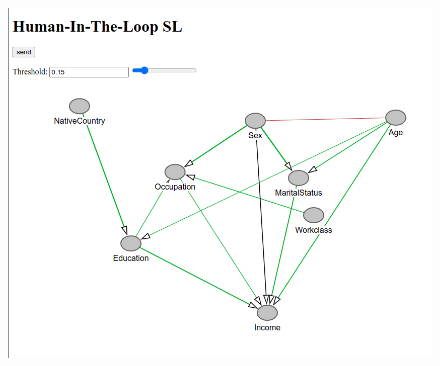 \documentclass{beamer}
\begin{document}
\begin{frame}
	\begin{figure}
		\centering
		\includegraphics[scale=0.35]{5.png}
	\end{figure}
\end{frame}
\end{document}
